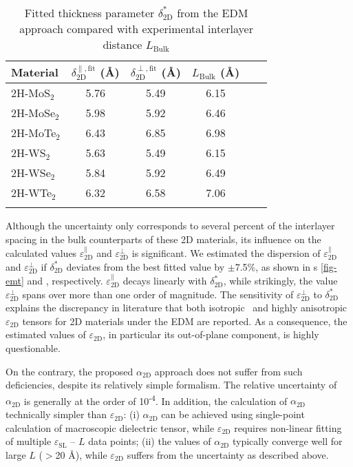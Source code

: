 \begin{table}[!htbp]
  \centering
  \caption{Fitted thickness parameter $\delta_{\mathrm{2D}}^{*}$ from
    the EDM approach compared with experimental interlayer distance
    $L_{\mathrm{Bulk}}$}
  \label{tab:diel-fitting}
  \begin{tabular}[htbp]{lccccc}
  \hline{}
  Material & $\delta_{\mathrm{2D}}^{\parallel, \mathrm{fit}}$ (\AA) & $\delta_{\mathrm{2D}}^{\perp, \mathrm{fit}}$ ({\AA})& $L_{\mathrm{Bulk}}$ ({\AA}) \\
  \hline{}
  2H-MoS$_{2}$ & 5.76 & 5.49 & 6.15 \\
  2H-MoSe$_{2}$ & 5.98 & 5.92 & 6.46\\
  2H-MoTe$_{2}$ & 6.43 & 6.85 & 6.98 \\
  2H-WS$_{2}$ & 5.63 & 5.49 & 6.15 \\
  2H-WSe$_{2}$ & 5.84 & 5.92 & 6.49 \\
  2H-WTe$_{2}$ & 6.32 & 6.58 & 7.06 \\
  \hline{}
  \end{tabular}
\end{table}
% 
%
Although the uncertainty only corresponds to several percent of the
interlayer spacing in the bulk counterparts of these 2D materials, its
influence on the calculated values
$\varepsilon_{\mathrm{2D}}^{\parallel}$ and
$\varepsilon_{\mathrm{2D}}^{\perp}$ is significant. We estimated the
dispersion of $\varepsilon_{\mathrm{2D}}^{\parallel}$ and
$\varepsilon_{\mathrm{2D}}^{\perp}$ if $\delta^{*}_{\mathrm{2D}}$
deviates from the best fitted value by $\pm{}$7.5\%, as shown in
s \autoref{fig-emt} and ,
respectively. $\varepsilon_{\mathrm{2D}}^{\parallel}$ decays linearly
with $\delta^{*}_{\mathrm{2D}}$,
while strikingly, the value $\varepsilon_{\mathrm{2D}}^{\perp}$ spans
over more than one order of magnitude. The sensitivity of
$\varepsilon_{\mathrm{2D}}^{\perp}$ to $\delta^{*}_{\mathrm{2D}}$
explains the discrepancy in literature that both
isotropic~\autocite{Sohier_2016_2D_eps} and highly
anisotropic~\autocite{Matthes_2016_effective_PRB,Laturia_2018_2D_eps}
$\varepsilon_{\mathrm{2D}}$ tensors for 2D materials under the EDM are
reported. As a consequence, the estimated values of
$\varepsilon_{\mathrm{2D}}$, in particular its out-of-plane component,
is highly questionable.

On the contrary, the proposed $\alpha_{\mathrm{2D}}$ approach does not
suffer from such deficiencies, despite its relatively simple
formalism. The relative uncertainty of $\alpha_{\mathrm{2D}}$ is
generally at the order of 10\textsuperscript{-4}. In addition, the
calculation of $\alpha_{\mathrm{2D}}$ technically simpler than
$\varepsilon_{\mathrm{2D}}$: (i) $\alpha_{\mathrm{2D}}$ can be
achieved using single-point calculation of macroscopic dielectric
tensor, while $\varepsilon_{\mathrm{2D}}$ requires non-linear fitting
of multiple $\varepsilon_{\mathrm{SL}}$ -- $L$ data points; (ii) the
values of $\alpha_{\mathrm{2D}}$ typically converge well for large $L$
($>$20 \AA{}), while $\varepsilon_{\mathrm{2D}}$ suffers from the
uncertainty as described above.


